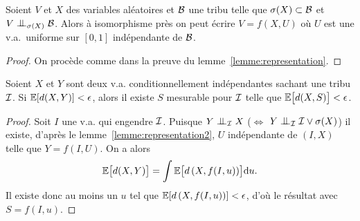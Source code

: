 \documentclass[12pt,a4paper]{article}
\begin{document}
\begin{appendices}
\begin{lemme}\label{lemme:representation2}
%  

Soient $V$ et $X$ des variables aléatoires et $\mathcal{B}$ une tribu telle que 
$\sigma(X) \subset \mathcal{B}$ et  $V \indep_{\sigma(X)} \BB$. 
Alors à isomorphisme près on peut écrire 
$V = f(X, U)$ où $U$ est une v.a.\ uniforme sur 
$[0,1]$ indépendante de $\mathcal{B}$. 
\end{lemme}

\begin{proof}
On procède comme dans la preuve du lemme~\ref{lemme:representation}. 
\end{proof}

\begin{lemme}\label{lemme:desintegr}
Soient $X$ et $Y$ sont deux v.a. conditionnellement indépendantes sachant une tribu $\mathcal{I}$. 
Si $\mathbb{E}[d(X,Y)] < \epsilon$, alors il existe $S$ mesurable pour $\mathcal{I}$ telle que $\mathbb{E}\bigl[d(X,S)\bigr] < \epsilon$.
\end{lemme}

\begin{proof}
Soit $I$  une v.a. qui engendre $\mathcal{I}$. Puisque 
$Y \indep_\II X$ ($\iff$ $Y \indep_{\II} \II \vee \sigma(X)$)
 il existe, d'après le lemme~\ref{lemme:representation2}, 
  $U$ indépendante de $(I,X)$ telle que $Y=f(I,U)$. On a alors 
$$
\mathbb{E}\bigl[d(X,Y)\bigr] = \int \mathbb{E}\bigl[d\left(X, f(I, u)\right)\bigr]\mathrm{d}u.
$$
Il existe donc au moins un $u$ tel que $\mathbb{E}[d\left(X, f(I, u)\right)] < \epsilon$, 
d'où le résultat avec $S=f(I,u)$. 
\end{proof}

%
%



\end{appendices}
\end{document}
